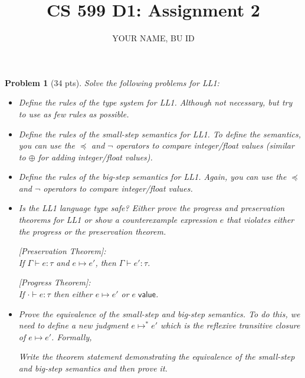 \documentclass{article}
\title{CS 599 D1: Assignment 2}
\author{YOUR NAME, BU ID}
\date{}
\newcommand{\m}[1]{\mathsf{#1}}
\newcommand{\step}{\mapsto}
\newcommand{\val}[1]{#1 \; \m{value}}
\newcommand{\G}{\Gamma}
\newcommand{\mstep}{\step^{*}}
\newtheorem{problem}{Problem}
\begin{document}
\maketitle

\begin{problem}[34 pts]
Solve the following problems for LL1:

    \begin{itemize}
        \item[(4 pts)] Define the rules of the type system for LL1. Although not necessary, but try to use as
        few rules as possible.
        
        \item[(5 pts)] Define the rules of the small-step semantics for LL1. To define the semantics, you can use the $\preceq$
        and $\neg$ operators to compare integer/float values (similar to $\oplus$ for adding integer/float values).

        \item[(5 pts)] Define the rules of the big-step semantics for LL1. Again, you can use the $\preceq$ and $\neg$
        operators to compare integer/float values.
        
        \item[(10 pts)] Is the LL1 language type safe? Either prove the progress and preservation theorems for LL1
        or show a counterexample expression $e$ that violates either the progress or the preservation theorem.

        [Preservation Theorem]:\\
        If $\G \vdash e : \tau$ and $e \step e'$, then $\G \vdash e' : \tau$.

        [Progress Theorem]:\\
        If $\cdot \vdash e : \tau$ then either $e \step e'$ or $\val{e}$.

        \item[(10 pts)] Prove the equivalence of the small-step and big-step semantics. To do this, we need to define
        a new judgment $e \mstep e'$ which is the reflexive transitive closure of $e \step e'$. Formally,

        Write the theorem statement demonstrating the equivalence of the small-step and big-step semantics and then
        prove it.
        
    \end{itemize}
\end{problem}
\end{document}
